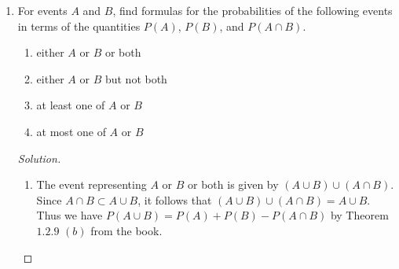 \documentclass[12pt]{article}
\theoremstyle{definition}
\theoremstyle{plain}
\newenvironment{solution}
  {\begin{proof}[Solution]}
  {\end{proof}}
\begin{document}
\begin{enumerate}
\item For events $ A $ and $ B $, find formulas for the probabilities of the following events in terms of the quantities $ P(A) $, $ P(B) $, and $ P(A \cap B) $.
	\begin{enumerate}
	\item either $ A $ or $ B $ or both
	\item either $ A $ or $ B $ but not both
	\item at least one of $ A $ or $ B $
	\item at most one of $ A $ or $ B$
	\end{enumerate}
	\begin{solution}
	\begin{enumerate}
	
	\item The event representing $ A $ or $ B $ or both is given by $ (A \cup B) \cup (A \cap B) $.
		Since $ A \cap B \subset A \cup B $, it follows that $ (A \cup B) \cup (A \cap B) =  A \cup B$. Thus we have $ P(A \cup B) = P(A) + P(B) - P(A \cap B) $ by Theorem $ 1.2.9 $ $ (b) $ from the book.
		

\end{enumerate}
\end{solution}
\end{enumerate}
\end{document}
